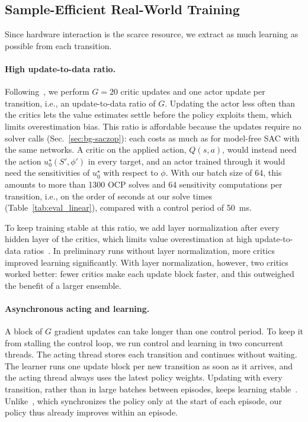 \documentclass{l4dc2027}
\let\cite\citep
\begin{document}
\subsection{Sample-Efficient Real-World Training}
\label{sec:training}

Since hardware interaction is the scarce resource, we extract as much learning
as possible from each transition.

\paragraph{High update-to-data ratio.} Following~\cite{smith2022walk}, we
perform $G=20$ critic updates and one actor update per transition, i.e., an
update-to-data ratio of $G$. Updating the actor less often than the critics
lets the value estimates settle before the policy exploits them, which limits
overestimation bias. This ratio is affordable because the
updates require no solver calls (Sec.~\ref{sec:bg-saczop}): each costs as much
as for model-free \ac{SAC} with the same networks. A critic on the applied
action, $Q(s,a)$, would instead need the action $u_0^\star(S',\phi')$ in every
target, and an actor trained through it would need the sensitivities of
$u_0^\star$ with respect to $\phi$. With our batch size of 64, this amounts to
more than 1300 \ac{OCP} solves and 64 sensitivity computations per transition,
i.e., on the order of seconds at our solve times (Table~\ref{tab:eval_linear}),
compared with a control period of 50~ms.

To keep training stable at this ratio, we add layer
normalization after every hidden layer of the critics, which limits value
overestimation at high update-to-data ratios~\cite{ball2023rlpd}. In
preliminary runs without layer normalization, more critics improved learning
significantly. With layer normalization, however, two critics worked better:
fewer critics make each update block faster, and this outweighed the benefit of
a larger ensemble.

\paragraph{Asynchronous acting and learning.} A block of $G$ gradient updates can take longer than one control period. To
keep it from stalling the control loop, we run control and learning in two
concurrent threads. The acting thread stores each transition and continues
without waiting. The learner runs one update block per new transition as soon
as it arrives, and the acting thread always uses the latest policy weights.
Updating with every transition, rather than in large batches between
episodes, keeps learning stable~\cite{smith2022walk}. Unlike~\cite{westenbroek2022lyapunov},
which synchronizes the policy only at the start of each episode, our policy
thus already improves within an episode.
\end{document}
